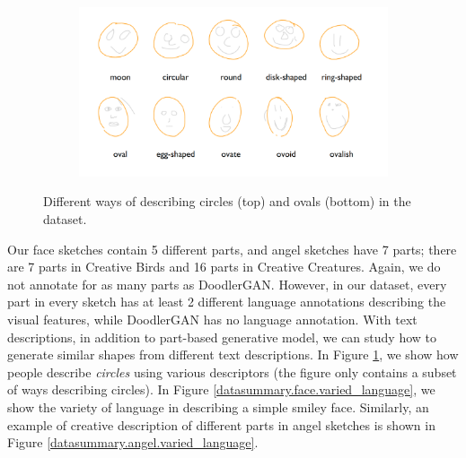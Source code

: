 \begin{figure}[!h]
\begin{subfigure}{\textwidth}
\centering
\includegraphics[width=\linewidth]{data_collection/summary/circles_descriptions.png}  
\end{subfigure}
\caption{Different ways of describing circles (top) and ovals (bottom) in the dataset.}
\label{datasummary.circles.varied_language}
\end{figure}

Our face sketches contain 5 different parts, and angel sketches have 7 parts; there are 7 parts in Creative Birds and 16 parts in Creative Creatures. Again, we do not annotate for as many parts as DoodlerGAN. 
However, in our dataset, every part in every sketch has at least 2 different language annotations describing the visual features, while DoodlerGAN has no language annotation. 
With text descriptions, in addition to part-based generative model, we can study how to generate similar shapes from different text descriptions. In Figure \ref{datasummary.circles.varied_language}, we show how people describe \textit{circles} using various descriptors (the figure only contains a subset of ways describing circles).  
In Figure \ref{datasummary.face.varied_language}, we show the variety of language in describing a simple smiley face. Similarly, an example of creative description of different parts in angel sketches is shown in Figure \ref{datasummary.angel.varied_language}.  


